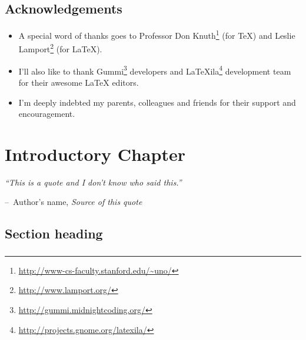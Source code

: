 \documentclass[a4paper,11pt]{book}
\makeatletter
\newenvironment{chapquote}[2][2em]
  {\setlength{\@tempdima}{#1}%
   \def\chapquote@author{#2}%
   \parshape 1 \@tempdima \dimexpr\textwidth-2\@tempdima\relax%
   \itshape}
  {\par\normalfont\hfill--\ \chapquote@author\hspace*{\@tempdima}\par\bigskip}
\makeatother
\begin{document}
\section*{Acknowledgements}
\begin{itemize}
\item A special word of thanks goes to Professor Don Knuth\footnote{\url{http://www-cs-faculty.stanford.edu/~uno/}} (for \TeX{}) and Leslie Lamport\footnote{\url{http://www.lamport.org/}} (for \LaTeX{}).
\item I'll also like to thank Gummi\footnote{\url{http://gummi.midnightcoding.org/}} developers and LaTeXila\footnote{\url{http://projects.gnome.org/latexila/}} development team for their awesome \LaTeX{} editors.
\item I'm deeply indebted my parents, colleagues and friends for their support and encouragement.
\end{itemize}

\chapter{Introductory Chapter}

\begin{chapquote}{Author's name, \textit{Source of this quote}}
``This is a quote and I don't know who said this.''
\end{chapquote}

\section{Section heading}


\subsection{}


\subsection{}

\subsection{}


\subsection{}
\end{document}
